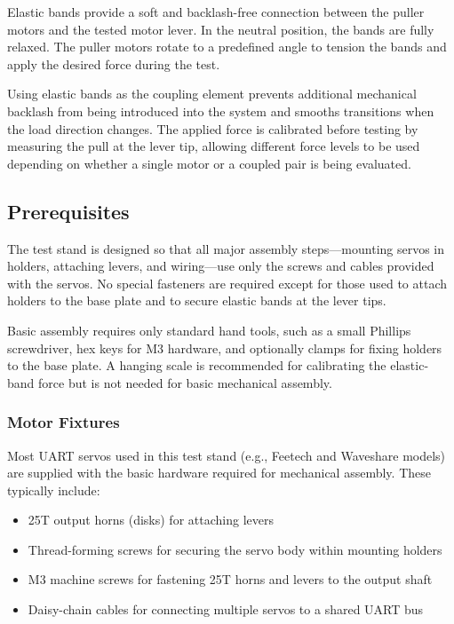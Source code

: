 \documentclass[11pt,letterpaper]{article}
\begin{document}
Elastic bands provide a soft and backlash-free connection between the puller motors and the tested motor lever. In the neutral position, the bands are fully relaxed. The puller motors rotate to a predefined angle to tension the bands and apply the desired force during the test.

Using elastic bands as the coupling element prevents additional mechanical backlash from being introduced into the system and smooths transitions when the load direction changes. The applied force is calibrated before testing by measuring the pull at the lever tip, allowing different force levels to be used depending on whether a single motor or a coupled pair is being evaluated.

\subsection{Prerequisites}
\label{subsec:prerequisites}

The test stand is designed so that all major assembly steps—mounting servos in holders, attaching levers, and wiring—use only the screws and cables provided with the servos. No special fasteners are required except for those used to attach holders to the base plate and to secure elastic bands at the lever tips.

Basic assembly requires only standard hand tools, such as a small Phillips screwdriver, hex keys for M3 hardware, and optionally clamps for fixing holders to the base plate. A hanging scale is recommended for calibrating the elastic-band force but is not needed for basic mechanical assembly.

\subsubsection{Motor Fixtures}
\label{subsubsec:motor-fixtures}

Most UART servos used in this test stand (e.g., Feetech and Waveshare models) are supplied with the basic hardware required for mechanical assembly. These typically include:

\begin{itemize}
    \item 25T output horns (disks) for attaching levers
    \item Thread-forming screws for securing the servo body within mounting holders
    \item M3 machine screws for fastening 25T horns and levers to the output shaft
    \item Daisy-chain cables for connecting multiple servos to a shared UART bus
\end{itemize}
\end{document}
